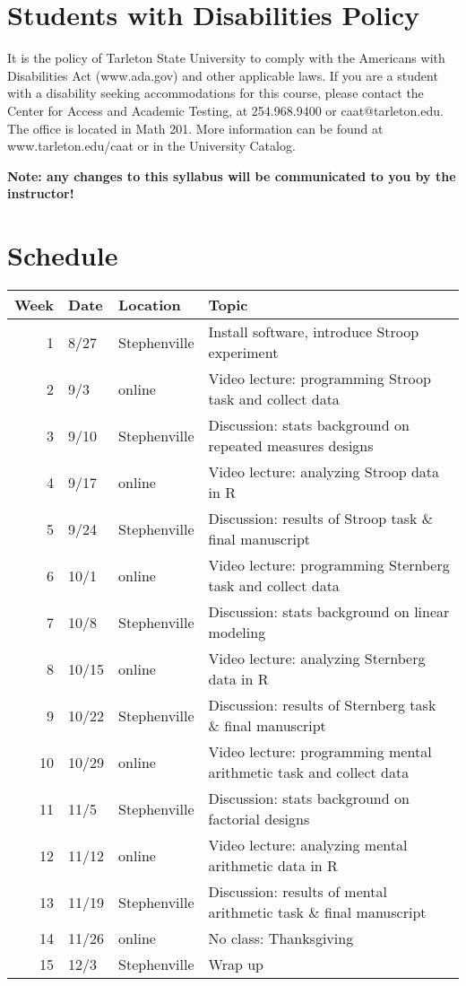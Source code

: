 \documentclass[10pt]{article}
\begin{document}
\section*{Students with Disabilities Policy}
\label{sec:orgb6d9547}

It is the policy of Tarleton State University to comply with the Americans with Disabilities  Act (www.ada.gov) and other applicable laws.  If you are a student with a disability seeking accommodations for this course, please contact the Center for Access and Academic Testing, at 254.968.9400 or caat@tarleton.edu. The office is located in Math 201. More information can be found at www.tarleton.edu/caat or in the University Catalog.​

\textbf{Note:  any changes to this syllabus will be communicated to you by the instructor!}

\section*{Schedule}
\label{sec:org82acc57}

\begin{center}
\begin{tabular}{rlll}
Week & Date & Location & Topic\\
\hline
1 & 8/27 & Stephenville & Install software, introduce Stroop experiment\\
2 & 9/3 & online & Video lecture: programming Stroop task and collect data\\
3 & 9/10 & Stephenville & Discussion: stats background on repeated measures designs\\
4 & 9/17 & online & Video lecture: analyzing Stroop data in R\\
5 & 9/24 & Stephenville & Discussion: results of Stroop task \& final manuscript\\
6 & 10/1 & online & Video lecture: programming Sternberg task and collect data\\
7 & 10/8 & Stephenville & Discussion: stats background on linear modeling\\
8 & 10/15 & online & Video lecture: analyzing Sternberg data in R\\
9 & 10/22 & Stephenville & Discussion: results of Sternberg task \& final manuscript\\
10 & 10/29 & online & Video lecture: programming mental arithmetic task and collect data\\
11 & 11/5 & Stephenville & Discussion: stats background on factorial designs\\
12 & 11/12 & online & Video lecture: analyzing mental arithmetic data in R\\
13 & 11/19 & Stephenville & Discussion: results of mental arithmetic task \& final manuscript\\
14 & 11/26 & online & No class: Thanksgiving\\
15 & 12/3 & Stephenville & Wrap up\\
\end{tabular}
\end{center}
\end{document}
